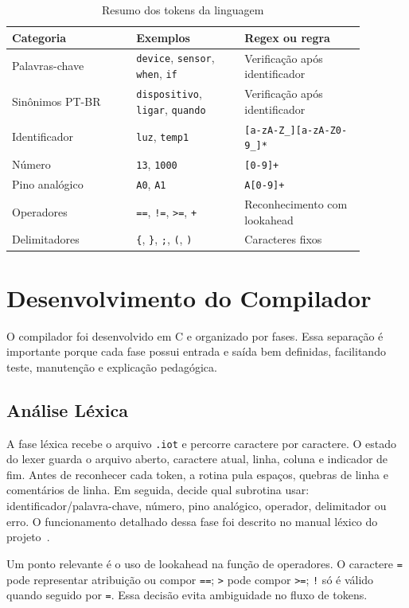 \documentclass[conference]{IEEEtran}
\begin{document}
\begin{table}[htbp]
\caption{Resumo dos tokens da linguagem}
\label{tab:tokens}
\centering
\begin{tabular}{p{0.31\linewidth}p{0.27\linewidth}p{0.3\linewidth}}
\toprule
\textbf{Categoria} & \textbf{Exemplos} & \textbf{Regex ou regra} \\
\midrule
Palavras-chave & \texttt{device}, \texttt{sensor}, \texttt{when}, \texttt{if} & Verificação após identificador \\
Sinônimos PT-BR & \texttt{dispositivo}, \texttt{ligar}, \texttt{quando} & Verificação após identificador \\
Identificador & \texttt{luz}, \texttt{temp1} & \texttt{[a-zA-Z\_][a-zA-Z0-9\_]*} \\
Número & \texttt{13}, \texttt{1000} & \texttt{[0-9]+} \\
Pino analógico & \texttt{A0}, \texttt{A1} & \texttt{A[0-9]+} \\
Operadores & \texttt{==}, \texttt{!=}, \texttt{>=}, \texttt{+} & Reconhecimento com lookahead \\
Delimitadores & \texttt{\{}, \texttt{\}}, \texttt{;}, \texttt{(}, \texttt{)} & Caracteres fixos \\
\bottomrule
\end{tabular}
\end{table}

\section{Desenvolvimento do Compilador}
O compilador foi desenvolvido em C e organizado por fases. Essa separação é importante porque cada fase possui entrada e saída bem definidas, facilitando teste, manutenção e explicação pedagógica.

\subsection{Análise Léxica}
A fase léxica recebe o arquivo \texttt{.iot} e percorre caractere por caractere. O estado do lexer guarda o arquivo aberto, caractere atual, linha, coluna e indicador de fim. Antes de reconhecer cada token, a rotina pula espaços, quebras de linha e comentários de linha. Em seguida, decide qual subrotina usar: identificador/palavra-chave, número, pino analógico, operador, delimitador ou erro. O funcionamento detalhado dessa fase foi descrito no manual léxico do projeto~\cite{docs-lex}.

Um ponto relevante é o uso de lookahead na função de operadores. O caractere \texttt{=} pode representar atribuição ou compor \texttt{==}; \texttt{>} pode compor \texttt{>=}; \texttt{!} só é válido quando seguido por \texttt{=}. Essa decisão evita ambiguidade no fluxo de tokens.
\end{document}

